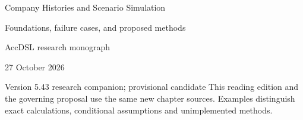 \documentclass[11pt,a4paper]{report}
\begin{document}
\hypersetup{pageanchor=false}
\begin{titlepage}
{\Huge Company Histories and Scenario Simulation\par}
\vspace{12mm}
{\Large Foundations, failure cases, and proposed methods\par}
\vspace{8mm}
AccDSL research monograph\par 27 October 2026\par Version 5.43 research companion; provisional candidate
\vfill
This reading edition and the governing proposal use the same new chapter sources. Examples distinguish exact calculations, conditional assumptions and unimplemented methods.
\end{titlepage}
\hypersetup{pageanchor=true}
\tableofcontents
\clearpage{}


























\clearpage\label{sim:body-end}

\begingroup\raggedright
\endgroup
\end{document}

